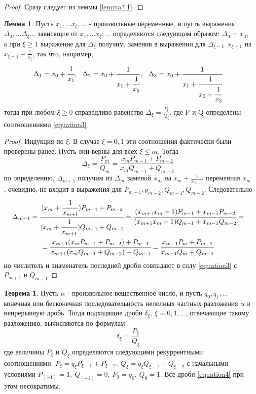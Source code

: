 \documentclass[a4paper, 12pt]{article}
\theoremstyle{definition}
\newtheorem{theorem}{Теорема}[section]
\newtheorem{lemma}{Лемма}[section]
\begin{document}
    \begin{proof}
        Сразу следует из леммы \ref{lemma7.1}.
    \end{proof} 
    \begin{lemma}\label{lemma7.3}
        Пусть $x_1,\dots x_{\xi},\dots$ - произвольные переменные, и пусть выражения $\Delta_0,\dots \Delta_{\xi}\dots$ зависящие от $x_1,\dots x_{\xi},\dots$ определяются следующим образом: $\Delta_0=x_0$, а при $\xi\geq 1$ выражение для $\Delta_{\xi}$ получим, заменив в выражении для $\Delta_{\xi-1}\ \ x_{\xi-1}$ на $x_{\xi-1}+\frac{1}{x_{\xi}}$, так что, например,
        \[\Delta_1=x_0+\cfrac{1}{x_1},\ \ \Delta_2=x_0+\frac{1}{x_1+\cfrac{1}{x_2}},\ \ \Delta_3=x_0+\frac{1}{x_1+\cfrac{1}{x_2+\cfrac{1}{x_3}}}\]
        тогда при любом $\xi\geq 0$ справедливо равенство $\Delta_{\xi}=\frac{P_{\xi}}{Q_{\xi}}$, где P и Q определены соотношениями \eqref{equation3}
    \end{lemma} 
    \begin{proof}
        Индукция по $\xi$. В случае $\xi=0,1$ эти соотношения фактически были проверены ранее. Пусть они верны для всех $\xi\leq m$. Тогда
        \[\Delta_{\xi}=\frac{P_m}{Q_m}=\frac{x_m P_{m-1}+P_{m-2}}{x_m Q_{m-1}+Q_{m-2}}\]
        по определению, $\Delta_{m+1}$ получим из $\Delta_m$ заменой $x_m$ на $x_m+\frac{1}{x_{m+1}}$ переменная $x_m$, очевидно, не входит в выражения для $P_{m-1}, p_{m-2}, Q_{m-1}, Q_{m-2}$. Следовательно
        \begin{multline*}
        \Delta_{m+1}=\cfrac{(x_m+\cfrac{1}{x_{m+1}})P_{m-1}+P_{m-2}}{(x_m+\cfrac{1}{x_{m+1}})Q_{m-1}+Q_{m-2}}=\cfrac{(x_{m+1}x_m+1)P_{m-1}+x_{m-1}P_{m-2}}{(x_{m+1}x_m+1)Q_{m-1}+x_{m-1}Q_{m-2}}=\\=\cfrac{x_{m+1}(x_m P_{m-1}+P_{m-2})+P_{m-1}}{x_{m+1}(x_m Q_{m-1}+Q_{m-2})+Q_{m-1}}=\cfrac{x_{m+1}P_m+P_{m-1}}{x_{m+1}Q_m+Q_{m-1}}
        \end{multline*}
        но числитель и знаменатель последней дроби совпадают в силу \eqref{equation3} с $P_{m+1}$ и $Q_{m+1}$
    \end{proof} 
    \begin{theorem} \label{th7.2}
        Пусть $\alpha$ - произвольное вещественное число, и пусть $q_0, q_1, \dots$ - конечная или бесконечная последовательность неполных частных разложения $\alpha$ в непрерывную дробь. Тогда подходящие дроби $\delta_{\xi}, \ \xi=0,1,\dots$, отвечающие такому разложению, вычисляются по формулам
        \begin{equation} \label{equation4}
            \delta_{\xi}=\frac{P_{\xi}}{Q_{\xi}}
        \end{equation}
        где величины $P_{\xi}$ и $Q_{\xi}$ определяются следующими рекуррентными соотношениями: $P_{\xi}=q_{\xi}P_{\xi-1}+P_{\xi-2}, \ Q_{\xi}=q_{\xi}Q_{\xi-1}+Q_{\xi-2}$ с начальными условиями $P_{(-1)}=1,\ Q_{(-1)}=0,\ P_0=q_0,\ Q_0=1$. Все дроби \eqref{equation4} при этом несократимы.
    \end{theorem} 
\end{document}

